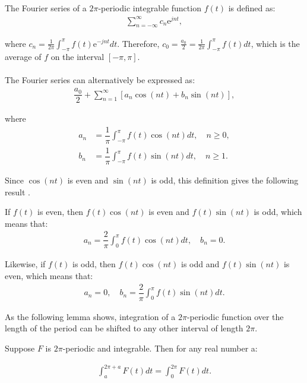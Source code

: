\begin{definition} \label{def:fourier_definition}
The Fourier series of a $2\pi$-periodic integrable function $f(t)$ is defined as:
\begin{align*}
	\sum_{n=-\infty}^\infty c_n \text{e}^{j n t},
\end{align*}

where $c_n = \frac{1}{2\pi}\int_{- \pi}^\pi f(t) \text{e}^{-j n t} dt$. Therefore, $c_0 = \frac{a_0}{2} = \frac{1}{2\pi} \int_{-\pi}^\pi f(t) dt$, which is the average of $f$ on the interval $[-\pi,\pi]$.
\\ \\
The Fourier series can alternatively be expressed as:
\begin{align*}
	\dfrac{a_0}{2} + \sum_{n=1}^{\infty} \left[ a_n \cos(n t) + 	b_n \sin(n t)\right],
\end{align*}

where
\begin{align*}
	a_n 
	&= \dfrac{1}{\pi} \int_{-\pi}^\pi f(t) \cos (n t) dt, \quad 	n \geq 0, \\
	b_n
	&= \dfrac{1}{\pi} \int_{-\pi}^\pi f(t) \sin (n t) dt, \quad 	n \geq 1.
\end{align*}
\end{definition}

Since $\cos(nt)$ is even and $\sin(nt)$ is odd, this definition gives the following result \cite{page 21, FAA}.

\begin{lemma}
If $f(t)$ is even, then $f(t)\cos(nt)$ is even and $f(t)\sin(nt)$ is odd, which means that:
\begin{align*}
a_n = \dfrac{2}{\pi} \int_0^\pi f(t) \cos(nt) dt, \quad b_n = 0.
\end{align*}

Likewise, if $f(t)$ is odd, then $f(t)\cos(nt)$ is odd and $f(t)\sin(nt)$ is even, which means that:
\begin{align*}
a_n = 0, \quad b_n = \dfrac{2}{\pi} \int_0^\pi f(t) \sin(nt) dt.
\end{align*}
\end{lemma}

As the following lemma shows, integration of a $2\pi$-periodic function over the length of the period can be shifted to any other interval of length $2\pi$.

\begin{lemma}\label{lemma:2pi-periodic_function}
Suppose $F$ is $2\pi$-periodic and integrable. Then for any real number a:

\begin{align}
\int_a^{2\pi+a}F(t) dt = \int_0^{2\pi}F(t)dt.
\end{align}
\end{lemma}

